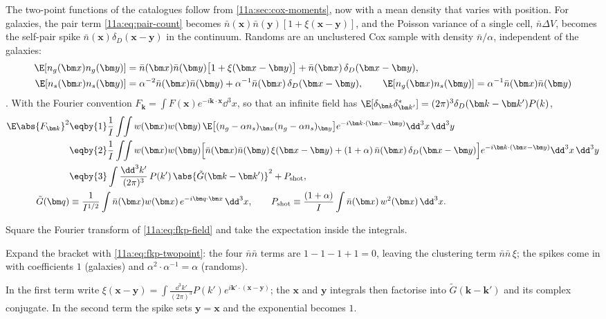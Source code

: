 The two-point functions of the catalogues follow from \cref{11a:sec:cox-moments},
now with a mean density that varies with position. For galaxies, the pair term
\eqref{11a:eq:pair-count} becomes $\bar n(\bm x)\bar n(\bm y)[1+\xi(\bm x-\bm y)]$,
and the Poisson variance of a single cell, $\bar n\Delta V$, becomes the self-pair
spike $\bar n(\bm x)\delta_D(\bm x-\bm y)$ in the continuum. Randoms are an
unclustered Cox sample with density $\bar n/\alpha$, independent of the galaxies:
\begin{equation}
\begin{aligned}
  \E[n_g(\bm x)n_g(\bm y)]&=\bar n(\bm x)\bar n(\bm y)\bigl[1+\xi(\bm x-\bm y)\bigr]
     +\bar n(\bm x)\,\delta_D(\bm x-\bm y),\\
  \E[n_s(\bm x)n_s(\bm y)]&=\alpha^{-2}\bar n(\bm x)\bar n(\bm y)
     +\alpha^{-1}\bar n(\bm x)\,\delta_D(\bm x-\bm y),\qquad
  \E[n_g(\bm x)n_s(\bm y)]=\alpha^{-1}\bar n(\bm x)\bar n(\bm y)
\end{aligned}
  \label{11a:eq:fkp-twopoint}
\end{equation}
. With the Fourier convention
$F_{\bm k}=\int F(\bm x)e^{-i\bm k\cdot\bm x}\dd^3x$, so that an infinite field
has $\E[\delta_{\bm k}\delta^*_{\bm k'}]=(2\pi)^3\delta_D(\bm k-\bm k')P(k)$,
\begin{align}
  \E\abs{F_{\bm k}}^2
  &\eqby{1}\frac1I\int\!\!\int w(\bm x)w(\bm y)\,
     \E\bigl[(n_g-\alpha n_s)_{\bm x}(n_g-\alpha n_s)_{\bm y}\bigr]
     e^{-i\bm k\cdot(\bm x-\bm y)}\dd^3x\,\dd^3y\nonumber\\
  &\eqby{2}\frac1I\int\!\!\int w(\bm x)w(\bm y)\Bigl[\bar n(\bm x)\bar n(\bm y)\,
     \xi(\bm x-\bm y)+(1+\alpha)\,\bar n(\bm x)\,\delta_D(\bm x-\bm y)\Bigr]
     e^{-i\bm k\cdot(\bm x-\bm y)}\dd^3x\,\dd^3y\nonumber\\
  &\eqby{3}\int\frac{\dd^3k'}{(2\pi)^3}\,P(k')\,
     \abs{\tilde G(\bm k-\bm k')}^2+P_{\mathrm{shot}},
  \label{11a:eq:fkp-mean}\\
  \tilde G(\bm q)&\equiv\frac{1}{I^{1/2}}\int\bar n(\bm x)w(\bm x)\,
     e^{-i\bm q\cdot\bm x}\,\dd^3x,\qquad
  P_{\mathrm{shot}}\equiv\frac{(1+\alpha)}{I}\int\bar n(\bm x)\,w^2(\bm x)\,\dd^3x .
  \nonumber
\end{align}
\begin{explain}
  \item Square the Fourier transform of \eqref{11a:eq:fkp-field} and take the
        expectation inside the integrals.
  \item Expand the bracket with \eqref{11a:eq:fkp-twopoint}: the four
        $\bar n\bar n$ terms are $1-1-1+1=0$, leaving the clustering term
        $\bar n\bar n\,\xi$; the spikes come in with coefficients $1$ (galaxies)
        and $\alpha^2\cdot\alpha^{-1}=\alpha$ (randoms).
  \item In the first term write $\xi(\bm x-\bm y)=\int\frac{\dd^3k'}{(2\pi)^3}P(k')
        e^{i\bm k'\cdot(\bm x-\bm y)}$; the $\bm x$ and $\bm y$ integrals then
        factorise into $\tilde G(\bm k-\bm k')$ and its complex conjugate. In the
        second term the spike sets $\bm y=\bm x$ and the exponential becomes $1$.
\end{explain}

